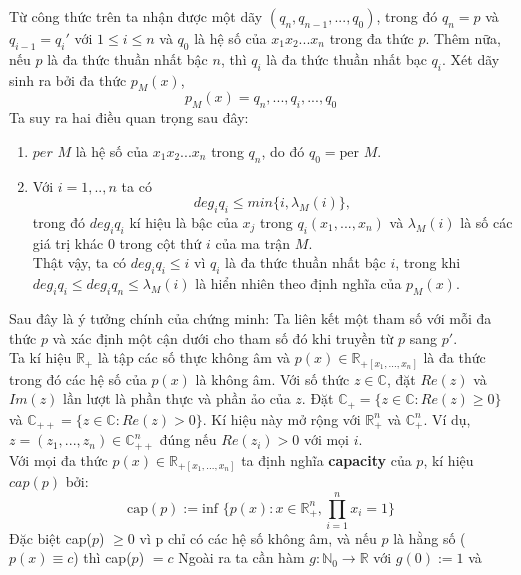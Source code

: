 \documentclass[a4paper, 12pt]{report}
\begin{document}
Từ công thức trên ta nhận được một dãy $(q_n,q_{n-1},...,q_0)$, trong đó $q_n=p$ và $q_{i-1} = q_{i}'$ với $1 \leq i \leq n$ và $q_0$ là hệ số của $x_1x_2...x_n$ trong đa thức $p$. Thêm nữa, nếu $p$ là đa thức thuần nhất bậc $n$, thì $q_i$ là đa thức thuần nhất bạc $q_i$. Xét dãy sinh ra bởi đa thức $p_M(x)$,
\begin{equation*}
p_M(x) = q_n,...,q_i,...,q_0
\end{equation*}
Ta suy ra hai điều quan trọng sau đây: 
\begin{enumerate}[label=\textbf{\Alph*.}]
\item $per$ $M$ là hệ số của $x_1x_2...x_n$ trong $q_n$, do đó $q_0 = \textrm{per }M$.
\item Với  $i=1,..,n$ ta có
\begin{equation}
	deg_{i}q_i \leq min\{i,\lambda_M(i)\}, \label{deg}
\end{equation}
trong đó $deg_{i}q_i $ kí hiệu là bậc của $x_{j}$ trong $q_i(x_1,...,x_n)$ và $\lambda_M(i)$ là số các giá trị khác 0 trong cột thứ $i$ của ma trận $M$. \\
Thật vậy, ta có $deg_{i}q_i \leq i$ vì $q_i$ là đa thức thuần nhất bậc $i$, trong khi $deg_{i}q_i \leq deg_{i}q_n \leq \lambda_M(i)$ là hiển nhiên theo định nghĩa của $p_M(x)$.
\end{enumerate}
Sau đây là ý tưởng chính của chứng minh: Ta liên kết một tham số với mỗi đa thức $p$ và xác định một cận dưới cho tham số đó khi truyền từ $p$ sang $p'$.\\
Ta kí hiệu $\mathbb{R}_{+}$ là tập các số thực không âm và $p(x) \in \mathbb{R}_{+[x_1,...,x_n]}$ là đa thức trong đó các hệ số của $p(x)$ là không âm. Với số thức $z \in \mathbb{C}$, đặt $Re(z)$ và $Im(z)$ lần lượt là phần thực và phần ảo của $z$. Đặt $\mathbb{C}_{+} = \{z \in \mathbb{C}: Re(z) \geq 0\}$ và $\mathbb{C}_{++} = \{z \in \mathbb{C}: Re(z) > 0\}$. Kí hiệu này mở rộng với $\mathbb{R}_{+}^{n}$ và $\mathbb{C}_{+}^{n}$. Ví dụ, $z=(z_1,...,z_n) \in \mathbb{C}_{++}^{n}$ đúng nếu $Re(z_i) >0$ với mọi $i$.\\
Với mọi đa thức $p(x) \in \mathbb{R}_{+[x_1,...,x_n]}$ ta định nghĩa \textbf{capacity} của $p$, kí hiệu $cap(p)$ bởi:
\begin{equation*}
\textrm{cap}(p) := \textrm{inf }\{p(x): x \in \mathbb{R}_{+}^{n}, \displaystyle \prod_{i=1}^{n}x_i = 1 \}
\end{equation*}
Đặc biệt cap($p$) $\geq 0$ vì p chỉ có các hệ số không âm, và nếu $p$ là hằng số ($p(x) \equiv c$) thì cap($p$) $= c$
Ngoài ra ta cần hàm $g: \mathbb{N}_{0} \rightarrow \mathbb{R}$ với $g(0) :=1$ và 
\end{document}
